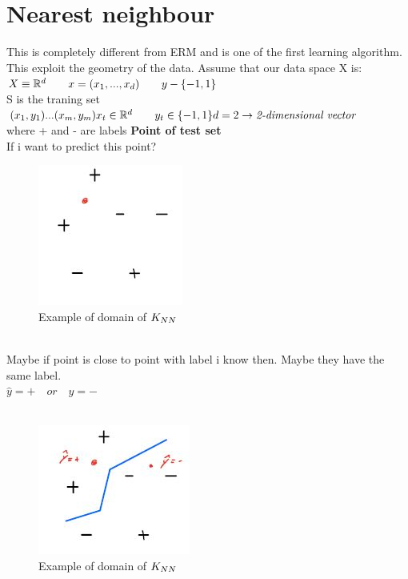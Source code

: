 \documentclass[../main.tex]{subfiles}
\begin{document}
\section{Nearest neighbour}
This is completely different from ERM and is one of the first learning
algorithm. This exploit the geometry of the data.
Assume that our data space X is:
\\
$ X \equiv \mathbb{R}^d \qquad x = (x_1, ..., x_d) \qquad y-\{-1,1\}
$
\\
S is the traning set $(x_1,y_1)...(x_m,y_m) \\ x_t \in \mathbb{R}^d \qquad y_t \in \{-1,1\} \\\\
d = 2 \rightarrow \textit{2-dimensional vector}\\
$\\
where + and - are labels
\newpage
\textbf{Point of test set}
\\
If i want to predict this point?
\begin{figure}[h]
    \centering
    \includegraphics[width=0.4\linewidth]{../img/lez3-img2.JPG}
    \caption{Example of domain of $K_{NN}$}
\end{figure}
\\
Maybe if point is close to point with label i know then. Maybe they have the same label.
\\
$\hat{y} = + \quad or \quad  \hat{y} = - $
\\\\
\begin{figure}[h]
    \centering
    \includegraphics[width=0.4\linewidth]{../img/lez3-img3.JPG}
    \caption{Example of domain of $K_{NN}$}
\end{figure}\\
\end{document}
